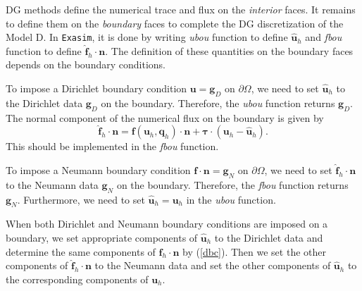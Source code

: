 \documentclass[11pt]{article}
\begin{document}
DG methods define the numerical trace and flux on the {\em interior} faces. It remains to define them on the {\em boundary} faces to complete the DG discretization of the Model D. In \texttt{Exasim}, it is done by writing {\em ubou} function to define $\widehat{\bm{u}}_h$ and {\em fbou} function to define $\widehat{\bm{f}}_h \cdot \bm n$. The definition of these quantities on the boundary faces depends on the boundary conditions.  

To impose a Dirichlet boundary condition $\bm u = \bm g_D$ on $\partial \Omega$, we need to set $\widehat{\bm{u}}_h$ to the Dirichlet data $\bm g_D$ on the boundary. Therefore, the  {\em ubou} function returns $\bm g_D$. The normal component of the numerical flux on the boundary is given by  
\begin{equation}
\label{dbc}
\widehat{\bm{f}}_h \cdot \bm n  = \bm{f}({\bm{u}}_h , \bm{q}_h)  \cdot \bm{n} +  \bm{\tau} \cdot ( \bm{u}_h - \widehat{\bm{u}}_h) .
\end{equation}
This should be implemented in the  {\em fbou} function.

To impose a Neumann boundary condition $\bm f \cdot \bm n = \bm g_N$ on $\partial \Omega$, we need to set $\widehat{\bm{f}}_h \cdot \bm n$ to the Neumann data $\bm g_N$ on the boundary. Therefore, the  {\em fbou} function returns $\bm g_N$. Furthermore, we need to set $\widehat{\bm{u}}_h = \bm u_h$ in the {\em ubou} function.

   
When both Dirichlet and Neumann boundary conditions are imposed on a boundary,  we set appropriate components of $\widehat{\bm{u}}_h$ to the Dirichlet data and determine the same components of $\widehat{\bm{f}}_h \cdot \bm n$ by (\ref{dbc}).  Then we set the other components of $\widehat{\bm{f}}_h \cdot \bm n$ to the Neumann data and set the     other components of $\widehat{\bm{u}}_h$ to the corresponding components  of $\bm u_h$. 
   
\end{document}
